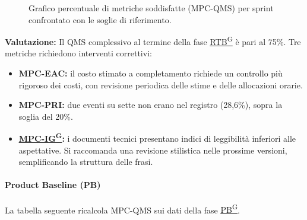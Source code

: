 \documentclass[a4paper,12pt]{article}
\providecommand{\glslink}[2]{\href{https://alittlebyte-19.github.io/Documentazione/glossario.html\#gls-#1}{\underline{#2}\textsuperscript{\scriptsize G}}}
\begin{document}
\begin{figure}[H]
\caption{Grafico percentuale di metriche soddisfatte (MPC-QMS) per sprint confrontato con le soglie di riferimento.}
\end{figure}

\noindent\textbf{Valutazione:} Il QMS complessivo al termine della fase \glslink{rtb-requirements-and-technology-baseline}{RTB} è pari al 75\%. Tre metriche richiedono interventi correttivi:
\begin{itemize}
    \item \textbf{MPC-EAC:} il costo stimato a completamento richiede un controllo più rigoroso dei costi, con revisione periodica delle stime e delle allocazioni orarie.
    \item \textbf{MPC-PRI:} due eventi su sette non erano nel registro (28,6\%), sopra la soglia del 20\%.
    \item \textbf{\glslink{indice-di-gulpease-mpc-ig}{MPC-IG}:} i documenti tecnici presentano indici di leggibilità inferiori alle aspettative. Si raccomanda una revisione stilistica nelle prossime versioni, semplificando la struttura delle frasi.
\end{itemize}

\paragraph*{Product Baseline (PB)} La tabella seguente ricalcola MPC-QMS sui dati della fase \glslink{pb-product-baseline}{PB}.
\end{document}
